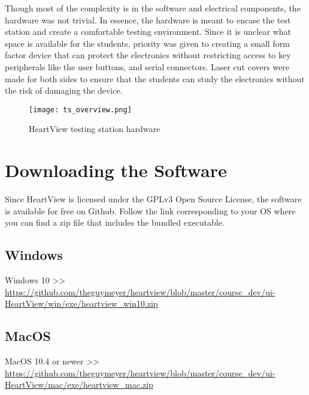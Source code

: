 \documentclass[11pt,fleqn]{book} %
\begin{document}
Though most of the complexity is in the software and electrical components, the hardware was not trivial. In essence, the hardware is meant to encase the test station and create a comfortable testing environment. Since it is unclear what space is available for the students, priority was given to creating a small form factor device that can protect the electronics without restricting access to key peripherals like the user buttons, and serial connectors. Laser cut covers were made for both sides to ensure that the students can study the electronics without the risk of damaging the device.\\

\begin{figure}[h]
	\centering\texttt{[image: ts\_overview.png]}
	\caption{HeartView testing station hardware}
	\label{fig:ts_overview} %
\end{figure}



\section{Downloading the Software}\label{sec:downloading_the_software}

Since HeartView is licensed under the GPLv3 Open Source License, the software is available for free on Github. Follow the link corresponding to your \ac{OS} where you can find a zip file that includes the bundled executable.

\subsection{Windows}

Windows 10 >>\\ \url{https://github.com/theguymeyer/heartview/blob/master/course_dev/ui-HeartView/win/exe/heartview_win10.zip}

\subsection{MacOS}

MacOS 10.4 or newer >>\\ \url{https://github.com/theguymeyer/heartview/blob/master/course_dev/ui-HeartView/mac/exe/heartview_mac.zip}
\end{document}
